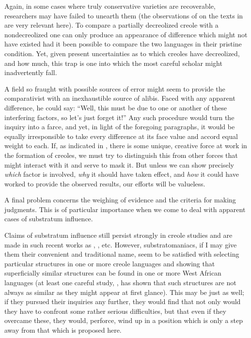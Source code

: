 Again, in some cases where truly conservative varieties are recoverable, researchers may have failed to unearth them (the obser\-vations of \citet{Bailey1971} on the texts in \citet{LePageEtAl1960} are very relevant here). To compare a partially decreolized creole with a nondecreolized one can only produce an appearance of difference which might not have existed had it been possible to compare the two languages in their pristine condition. Yet, given present uncertainties as to which creoles have decreolized, and how much, this trap is one into which the most careful scholar might inadvertently fall.

A field so fraught with possible sources of error might seem to provide the comparativist with an inexhaustible source of alibis. Faced with any apparent difference, he could say: ``Well, this must be due to one or another of these interfering factors, so let's just forget it!'' Any such procedure would turn the inquiry into a farce, and yet, in light of the foregoing paragraphs, it would be equally irresponsible to take every difference at its face value and accord equal weight to each. If, as indicated in , there is some unique, creative force at work in the formation of creoles, we must try to distinguish this from other forces that might interact with it and serve to mask it. But unless we can show precisely \textit{which} factor is involved, \textit{why} it should have taken effect, and \textit{how} it could have worked to provide the observed results, our efforts will be valueless.


A final problem concerns the weighing of evidence and the criteria for making judgments. This is of particular importance when we come to deal with apparent cases of substratum influence.

Claims of substratum influence still persist strongly in creole studies and are made in such recent works as \citet{JansenEtAl1978}, \citet{Alleyne1979, Alleyne1980}, etc. However, substrato\-maniacs, if I may give them their convenient and traditional name, seem to be satisfied with selecting particular structures in one or more creole languages and showing that superficially similar structures can be found in one or more West African languages (at least one careful study, \citealt{Huttar1975}, has shown that such structures are not always as similar as they might appear at first glance). This may be just as well; if they pursued their inquiries any further, they would find that not only would they have to confront some rather serious diffi\-culties, but that even if they overcame these, they would, perforce, wind up in a position which is only a step away from that which is proposed here.

